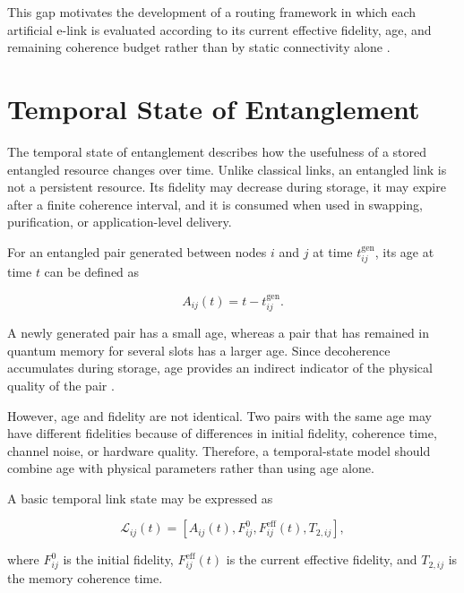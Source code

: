This gap motivates the development of a routing framework in which each artificial e-link is evaluated according to its current effective fidelity, age, and remaining coherence budget rather than by static connectivity alone \cite{ercetin2026fidelityage,ceran2026age,zheng2024decoherence,park2025quantum}.

\section{Temporal State of Entanglement}

The temporal state of entanglement describes how the usefulness of a stored entangled resource changes over time. Unlike classical links, an entangled link is not a persistent resource. Its fidelity may decrease during storage, it may expire after a finite coherence interval, and it is consumed when used in swapping, purification, or application-level delivery.

For an entangled pair generated between nodes $i$ and $j$ at time $t_{ij}^{\mathrm{gen}}$, its age at time $t$ can be defined as

\begin{equation}
    A_{ij}(t)
    =
    t-t_{ij}^{\mathrm{gen}}.
\end{equation}

A newly generated pair has a small age, whereas a pair that has remained in quantum memory for several slots has a larger age. Since decoherence accumulates during storage, age provides an indirect indicator of the physical quality of the pair \cite{ercetin2026fidelityage,ceran2026age}.

However, age and fidelity are not identical. Two pairs with the same age may have different fidelities because of differences in initial fidelity, coherence time, channel noise, or hardware quality. Therefore, a temporal-state model should combine age with physical parameters rather than using age alone.

A basic temporal link state may be expressed as

\begin{equation}
    \mathcal{L}_{ij}(t)
    =
    \left[
    A_{ij}(t),
    F_{ij}^{0},
    F_{ij}^{\mathrm{eff}}(t),
    T_{2,ij}
    \right],
\end{equation}

where $F_{ij}^{0}$ is the initial fidelity, $F_{ij}^{\mathrm{eff}}(t)$ is the current effective fidelity, and $T_{2,ij}$ is the memory coherence time.


